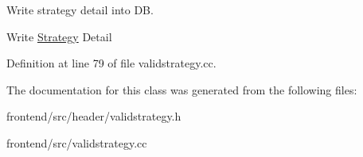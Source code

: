 Write strategy detail into D\-B. 

Write \hyperlink{classStrategy}{Strategy} Detail 

Definition at line 79 of file validstrategy.\-cc.



The documentation for this class was generated from the following files\-:\begin{DoxyCompactItemize}
\item 
frontend/src/header/validstrategy.\-h\item 
frontend/src/validstrategy.\-cc\end{DoxyCompactItemize}
